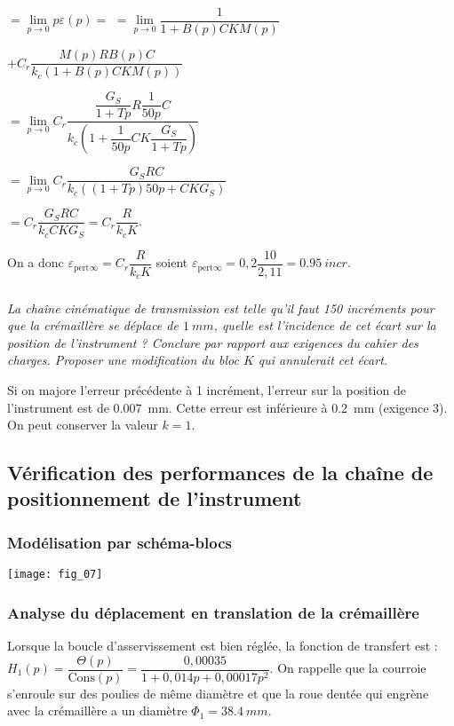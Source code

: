 \begin{multicols}{2}
\begin{corrige}
$=\lim\limits_{p\to 0} p \varepsilon (p) = $
$ =\lim\limits_{p\to 0}  \dfrac{1}{1+ B(p)C  K M(p)}  $

$+ C_r \dfrac{M(p)R B(p)C}{k_c\left( 1+ B(p)C  K M(p) \right)}  $

$ =\lim\limits_{p\to 0}  C_r \dfrac{\dfrac{G_S}{1+Tp}R \dfrac{1}{50p}C}{k_c\left( 1+ \dfrac{1}{50p}C  K \dfrac{G_S}{1+Tp} \right)}  $


$ = \lim\limits_{p\to 0}  C_r \dfrac{G_S R C}{k_c\left( \left(1+Tp \right)50p+ C  K G_S \right)}  $

$= C_r \dfrac{G_S R C}{k_c  C  K G_S }= C_r \dfrac{ R }{k_c   K }  $.

On a donc  $\varepsilon_{\text{pert} \infty} = C_r \dfrac{ R }{k_c   K }  $ soient $\varepsilon_{\text{pert} \infty} = 0,2 \dfrac{ 10}{2,1   1 } =\SI{0,95}{incr}$.


\end{corrige}
\else
\fi


\subparagraph{}\textit{La chaîne cinématique de transmission est telle qu’il faut 150 incréments pour que la crémaillère se déplace de $\SI{1}{mm}$, quelle est l’incidence de cet écart sur la position de l’instrument ? Conclure par rapport aux exigences du cahier des charges.
Proposer une modification du bloc $K$ qui annulerait cet écart.}
\ifprof
\begin{corrige}
Si on majore l'erreur précédente à 1 incrément, l'erreur sur la position de l’instrument est de \SI{0,007}{mm}.
Cette erreur est inférieure à \SI{0,2}{mm} (exigence 3).  On peut conserver la valeur $k=1$.
\end{corrige}
\else
\fi



\subsection*{Vérification des performances de la chaîne de positionnement de l'instrument}
\subsubsection*{Modélisation par schéma-blocs}

\begin{center}
\texttt{[image: fig\_07]}
\end{center}


\subsubsection*{Analyse du déplacement en translation de la crémaillère}
Lorsque la boucle d’asservissement est bien réglée, la fonction de transfert est : $H_1(p)=\dfrac{\Theta(p)}{\text{Cons}(p)} = \dfrac{0,00035}{1+0,014p+0,00017 p^2}$. 
On rappelle que la courroie s’enroule sur des poulies de même diamètre et que la roue dentée qui engrène avec la crémaillère a un diamètre $\Phi_1 = \SI{38,4}{mm}$.



\end{multicols}
